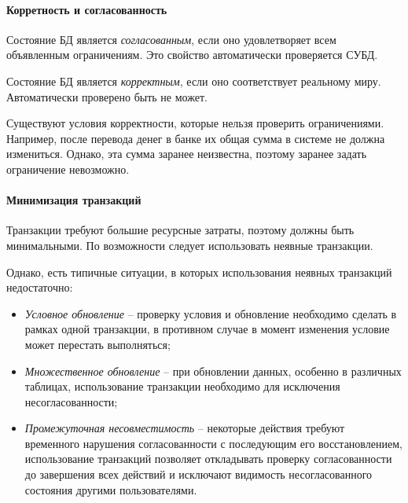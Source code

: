 \paragraph{Корретность и согласованность}

\begin{definition}
    Состояние БД является \textit{согласованным}, если оно удовлетворяет всем
    объявленным ограничениям. Это свойство автоматически проверяется СУБД.
\end{definition}

\begin{definition}
    Состояние БД является \textit{корректным}, если оно соответствует реальному
    миру. Автоматически проверено быть не может.
\end{definition}

Существуют условия корректности, которые нельзя проверить ограничениями.
Например, после перевода денег в банке их общая сумма в системе не должна
измениться. Однако, эта сумма заранее неизвестна, поэтому заранее задать
ограничение невозможно.

\paragraph{Минимизация транзакций}

Транзакции требуют большие ресурсные затраты, поэтому должны быть минимальными.
По возможности следует использовать неявные транзакции.

Однако, есть типичные ситуации, в которых использования неявных транзакций
недостаточно:

\begin {itemize}
    \item \textit{Условное обновление} -- проверку условия и обновление
        необходимо сделать в рамках одной транзакции, в противном случае в
        момент изменения условие может перестать выполняться;
    \item \textit{Множественное обновление} -- при обновлении данных, особенно
        в различных таблицах, использование транзакции необходимо для
        исключения несогласованности;
    \item \textit{Промежуточная несовместимость} -- некоторые действия требуют
        временного нарушения согласованности с последующим его восстановлением,
        использование транзакций позволяет откладывать проверку согласованности
        до завершения всех действий и исключают видимость несогласованного
        состояния другими пользователями.
\end {itemize}

